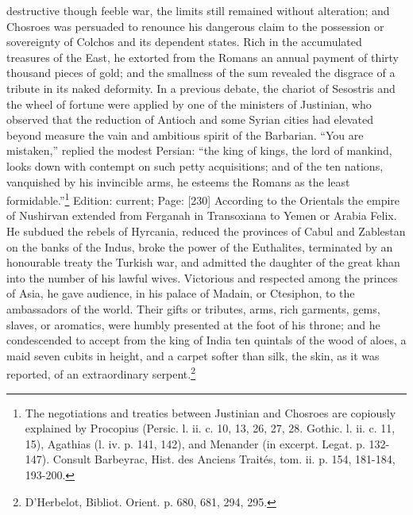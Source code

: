 destructive though feeble war, the limits still remained without alteration; and Chosroes was persuaded to renounce his dangerous claim to the possession or sovereignty of Colchos and its dependent states. Rich in the accumulated treasures of the East, he extorted from the Romans an annual payment of thirty thousand pieces of gold; and the smallness of the sum revealed the disgrace of a tribute in its naked deformity. In a previous debate, the chariot of Sesostris and the wheel of fortune were applied by one of the ministers of Justinian, who observed that the reduction of Antioch and some Syrian cities had elevated beyond measure the vain and ambitious spirit of the Barbarian. \texthebrew{“}You are mistaken,\texthebrew{}” replied the modest Persian: \texthebrew{“}the king of kings, the lord of mankind, looks down with contempt on such petty acquisitions; and of the ten nations, vanquished by his invincible arms, he esteems the Romans as the least formidable.\texthebrew{}”\footnote{The negotiations and treaties between Justinian and Chosroes are copiously explained by Procopius (Persic. l. ii. c. 10, 13, 26, 27, 28. Gothic. l. ii. c. 11, 15), Agathias (l. iv. p. 141, 142), and Menander (in excerpt. Legat. p. 132-147). Consult Barbeyrac, Hist. des Anciens Traités, tom. ii. p. 154, 181-184, 193-200.} Edition: current; Page: [230] According to the Orientals the empire of Nushirvan extended from Ferganah in Transoxiana to Yemen or Arabia Felix. He subdued the rebels of Hyrcania, reduced the provinces of Cabul and Zablestan on the banks of the Indus, broke the power of the Euthalites, terminated by an honourable treaty the Turkish war, and admitted the daughter of the great khan into the number of his lawful wives. Victorious and respected among the princes of Asia, he gave audience, in his palace of Madain, or Ctesiphon, to the ambassadors of the world. Their gifts or tributes, arms, rich garments, gems, slaves, or aromatics, were humbly presented at the foot of his throne; and he condescended to accept from the king of India ten quintals of the wood of aloes, a maid seven cubits in height, and a carpet softer than silk, the skin, as it was reported, of an extraordinary serpent.\footnote{D\texthebrew{}’Herbelot, Bibliot. Orient. p. 680, 681, 294, 295.}

